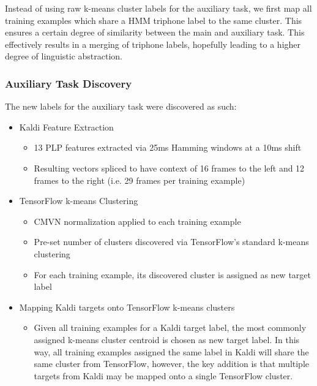 \documentclass[a4paper]{article}
\begin{document}
Instead of using raw k-means cluster labels for the auxiliary task, we first map all training examples which share a HMM triphone label to the same cluster. This ensures a certain degree of similarity between the main and auxiliary task. This effectively results in a merging of triphone labels, hopefully leading to a higher degree of linguistic abstraction.


\subsubsection{Auxiliary Task Discovery}

The new labels for the auxiliary task were discovered as such:

\begin{itemize}
\item Kaldi Feature Extraction
  \begin{itemize}
  \item 13 PLP features extracted via 25ms Hamming windows at a 10ms shift
  \item Resulting vectors spliced to have context of 16 frames to the left and 12 frames to the right (i.e. 29 frames per training example)
  \end{itemize}

\item TensorFlow k-means Clustering
  \begin{itemize}
  \item CMVN normalization applied to each training example
  \item Pre-set number of clusters discovered via TensorFlow's standard k-means clustering
  \item For each training example, its discovered cluster is assigned as new target label
  \end{itemize}

\item Mapping Kaldi targets onto TensorFlow k-means clusters
   \begin{itemize}
   \item Given all training examples for a Kaldi target label, the most commonly assigned k-means cluster centroid is chosen as new target label. In this way, all training examples assigned the same label in Kaldi will share the same cluster from TensorFlow, however, the key addition is that multiple targets from Kaldi may be mapped onto a single TensorFlow cluster.
  \end{itemize} 
\end{itemize}
\end{document}

